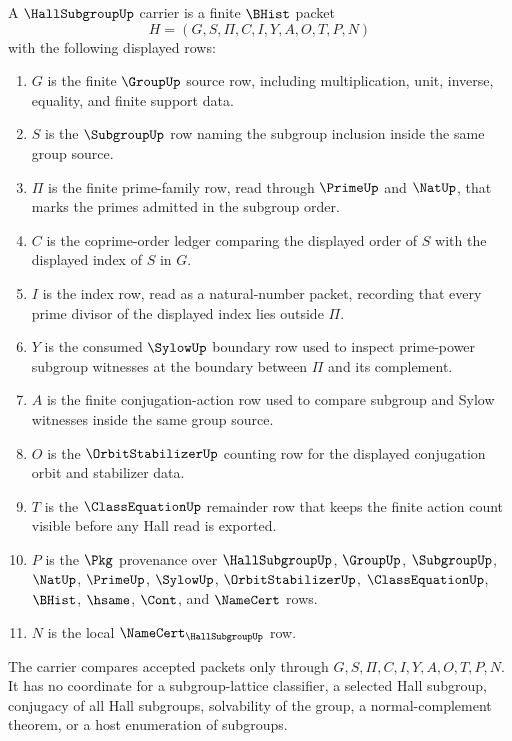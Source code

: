 \begin{definition}
\label{def:hall-subgroup-carrier}
A $\HallSubgroupUp$ carrier is a finite $\BHist$ packet
$$
H=(G,S,\Pi,C,I,Y,A,O,T,P,N)
$$
with the following displayed rows:
\begin{enumerate}
\item $G$ is the finite $\GroupUp$ source row, including multiplication, unit, inverse, equality, and finite support data.
\item $S$ is the $\SubgroupUp$ row naming the subgroup inclusion inside the same group source.
\item $\Pi$ is the finite prime-family row, read through $\PrimeUp$ and $\NatUp$, that marks the primes admitted in the subgroup order.
\item $C$ is the coprime-order ledger comparing the displayed order of $S$ with the displayed index of $S$ in $G$.
\item $I$ is the index row, read as a natural-number packet, recording that every prime divisor of the displayed index lies outside $\Pi$.
\item $Y$ is the consumed $\SylowUp$ boundary row used to inspect prime-power subgroup witnesses at the boundary between $\Pi$ and its complement.
\item $A$ is the finite conjugation-action row used to compare subgroup and Sylow witnesses inside the same group source.
\item $O$ is the $\OrbitStabilizerUp$ counting row for the displayed conjugation orbit and stabilizer data.
\item $T$ is the $\ClassEquationUp$ remainder row that keeps the finite action count visible before any Hall read is exported.
\item $P$ is the $\Pkg$ provenance over $\HallSubgroupUp$, $\GroupUp$, $\SubgroupUp$, $\NatUp$, $\PrimeUp$, $\SylowUp$, $\OrbitStabilizerUp$, $\ClassEquationUp$, $\BHist$, $\hsame$, $\Cont$, and $\NameCert$ rows.
\item $N$ is the local $\NameCert_{\HallSubgroupUp}$ row.
\end{enumerate}
The carrier compares accepted packets only through $G,S,\Pi,C,I,Y,A,O,T,P,N$. It has no coordinate for a subgroup-lattice classifier, a selected Hall subgroup, conjugacy of all Hall subgroups, solvability of the group, a normal-complement theorem, or a host enumeration of subgroups.
\end{definition}

